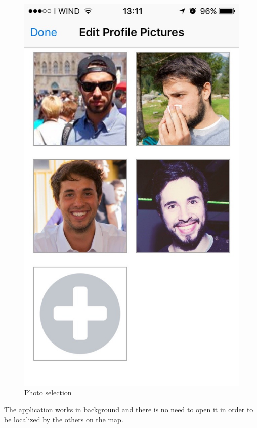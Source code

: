 \begin{multicols}{2}
\begin{figure}[H]
\centering
\includegraphics[scale=0.15]{./images/photo_selection.jpg}
\caption{\label{Augmented reality Experience}Photo selection}
\end{figure}
\end{multicols}

The application works in background and there is no need to open it in order to be localized by the others on the map.


